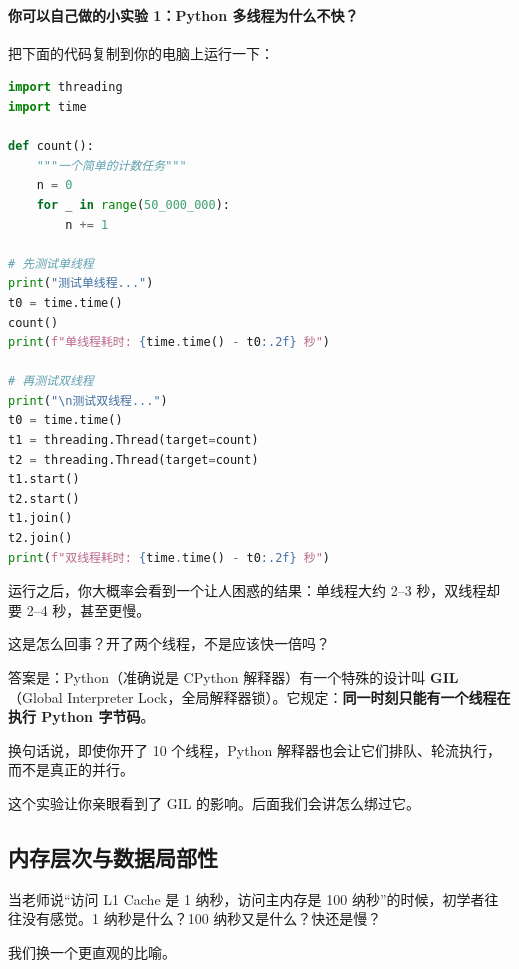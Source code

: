 \paragraph{你可以自己做的小实验 1：Python 多线程为什么不快？}

把下面的代码复制到你的电脑上运行一下：

\begin{lstlisting}[style=teaching, language=Python]
import threading
import time

def count():
    """一个简单的计数任务"""
    n = 0
    for _ in range(50_000_000):
        n += 1

# 先测试单线程
print("测试单线程...")
t0 = time.time()
count()
print(f"单线程耗时: {time.time() - t0:.2f} 秒")

# 再测试双线程
print("\n测试双线程...")
t0 = time.time()
t1 = threading.Thread(target=count)
t2 = threading.Thread(target=count)
t1.start()
t2.start()
t1.join()
t2.join()
print(f"双线程耗时: {time.time() - t0:.2f} 秒")
\end{lstlisting}

运行之后，你大概率会看到一个让人困惑的结果：单线程大约 2--3 秒，双线程却要 2--4 秒，甚至更慢。

这是怎么回事？开了两个线程，不是应该快一倍吗？

答案是：Python（准确说是 CPython 解释器）有一个特殊的设计叫 \textbf{GIL}（Global Interpreter Lock，全局解释器锁）。它规定：\textbf{同一时刻只能有一个线程在执行 Python 字节码}。

换句话说，即使你开了 10 个线程，Python 解释器也会让它们排队、轮流执行，而不是真正的并行。

这个实验让你亲眼看到了 GIL 的影响。后面我们会讲怎么绑过它。

\subsection*{内存层次与数据局部性}

当老师说“访问 L1 Cache 是 1 纳秒，访问主内存是 100 纳秒”的时候，初学者往往没有感觉。1 纳秒是什么？100 纳秒又是什么？快还是慢？

我们换一个更直观的比喻。


